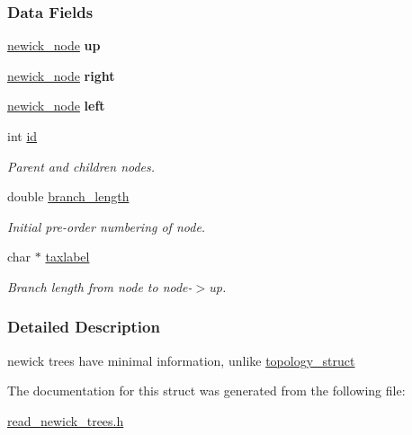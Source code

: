 \subsubsection*{Data Fields}
\begin{DoxyCompactItemize}
\item 
\mbox{\label{structnewick__node__struct_abf4311a6ecdcdb1e6d4392203296568c}} 
\hyperlink{structnewick__node__struct}{newick\+\_\+node} {\bfseries up}
\item 
\mbox{\label{structnewick__node__struct_a928110516dfc1bec3703422f712cf076}} 
\hyperlink{structnewick__node__struct}{newick\+\_\+node} {\bfseries right}
\item 
\mbox{\label{structnewick__node__struct_ae3b6eaf84d10df4685e241f6c535704c}} 
\hyperlink{structnewick__node__struct}{newick\+\_\+node} {\bfseries left}
\item 
\mbox{\label{structnewick__node__struct_adf502c2f86d329cbb6531ae229fb6631}} 
int \hyperlink{structnewick__node__struct_adf502c2f86d329cbb6531ae229fb6631}{id}
\begin{DoxyCompactList}\small\item\em Parent and children nodes. \end{DoxyCompactList}\item 
\mbox{\label{structnewick__node__struct_a9205ab7cce347279634f90af83d1e81d}} 
double \hyperlink{structnewick__node__struct_a9205ab7cce347279634f90af83d1e81d}{branch\+\_\+length}
\begin{DoxyCompactList}\small\item\em Initial pre-\/order numbering of node. \end{DoxyCompactList}\item 
\mbox{\label{structnewick__node__struct_a8d91f9fce7bf71a4c2723d64b402c868}} 
char $\ast$ \hyperlink{structnewick__node__struct_a8d91f9fce7bf71a4c2723d64b402c868}{taxlabel}
\begin{DoxyCompactList}\small\item\em Branch length from node to node-\/$>$up. \end{DoxyCompactList}\end{DoxyCompactItemize}


\subsubsection{Detailed Description}
newick trees have minimal information, unlike \hyperlink{structtopology__struct}{topology\+\_\+struct} 

The documentation for this struct was generated from the following file\+:\begin{DoxyCompactItemize}
\item 
\hyperlink{read__newick__trees_8h}{read\+\_\+newick\+\_\+trees.\+h}\end{DoxyCompactItemize}
